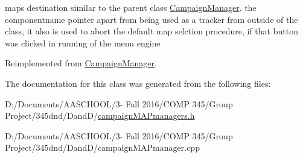 maps destination similar to the parent class \hyperlink{class_campaign_manager}{Campaign\+Manager}. the componentname pointer apart from being used as a tracker from outside of the class, it also is used to abort the default map selction procedure, if that button was clicked in running of the menu engine 

Reimplemented from \hyperlink{class_campaign_manager_af4ec02e5399f2a7bea50454eedd4ea62}{Campaign\+Manager}.



The documentation for this class was generated from the following files\+:\begin{DoxyCompactItemize}
\item 
D\+:/\+Documents/\+A\+A\+S\+C\+H\+O\+O\+L/3-\/ Fall 2016/\+C\+O\+M\+P 345/\+Group Project/345dnd/\+Dand\+D/\hyperlink{campaign_m_a_pmanagers_8h}{campaign\+M\+A\+Pmanagers.\+h}\item 
D\+:/\+Documents/\+A\+A\+S\+C\+H\+O\+O\+L/3-\/ Fall 2016/\+C\+O\+M\+P 345/\+Group Project/345dnd/\+Dand\+D/campaign\+M\+A\+Pmanager.\+cpp\end{DoxyCompactItemize}
